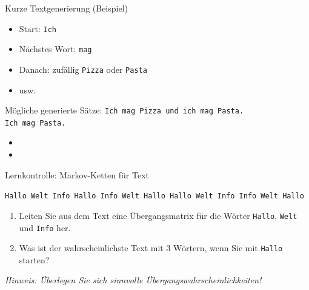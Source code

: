 \begin{frame}[fragile]{Kurze Textgenerierung (Beispiel)}
    \begin{itemize}[<+->]
        \item Start: \texttt{Ich}
        \item Nächstes Wort: \texttt{mag}
        \item Danach: zufällig \texttt{Pizza} oder \texttt{Pasta}
        \item usw.
    \end{itemize}
    \vspace{0.3cm}
    \begin{block}{Mögliche generierte Sätze:}
        \texttt{Ich mag Pizza und ich mag Pasta.}\\
        \texttt{Ich mag Pasta.}
    \end{block}
    \vspace{0.3cm}
\end{frame}

\begin{frame}
    \begin{itemize}
        \item {}
        \item {}
    \end{itemize}
\end{frame}
\begin{frame}{Lernkontrolle: Markov-Ketten für Text}
    \begin{myexercise}

        \texttt{Hallo Welt Info Hallo Info Welt Hallo Hallo Welt Info Info Welt Hallo}

        \begin{enumerate}
            \item Leiten Sie aus dem Text eine Übergangsmatrix für die Wörter \texttt{Hallo}, \texttt{Welt} und \texttt{Info} her.
            \item Was ist der wahrscheinlichste Text mit 3 Wörtern, wenn Sie mit \texttt{Hallo} starten?
        \end{enumerate}
        \textit{Hinweis: Überlegen Sie sich sinnvolle Übergangswahrscheinlichkeiten!}

    \end{myexercise}
\end{frame}

